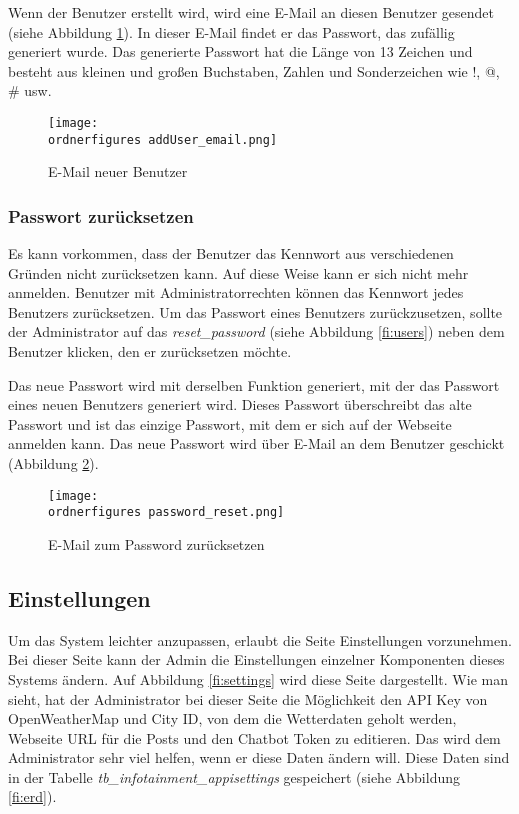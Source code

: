 Wenn der Benutzer erstellt wird, wird eine E-Mail an diesen Benutzer gesendet (siehe Abbildung \ref{fi:addUser_email}). In dieser E-Mail findet er das Passwort, das zufällig generiert wurde. Das generierte Passwort hat die Länge von 13 Zeichen und besteht aus kleinen und großen Buchstaben, Zahlen und Sonderzeichen wie !, @, \# usw.
\begin{figure}[H]
	\centering
	\texttt{[image: \\ordnerfigures addUser\_email.png]}
	\caption{E-Mail neuer Benutzer }
	\label{fi:addUser_email}
\end{figure}


\subsubsection{Passwort zurücksetzen}

Es kann vorkommen, dass der Benutzer das Kennwort aus verschiedenen Gründen nicht zurücksetzen kann. Auf diese Weise kann er sich nicht mehr anmelden. Benutzer mit Administratorrechten können das Kennwort jedes Benutzers zurücksetzen. Um das Passwort eines Benutzers zurückzusetzen, sollte der Administrator auf das \textit{reset\_password} (siehe Abbildung \ref{fi:users}) neben dem Benutzer klicken, den er zurücksetzen möchte.

Das neue Passwort wird mit derselben Funktion generiert, mit der das Passwort eines neuen Benutzers generiert wird. Dieses Passwort überschreibt das alte Passwort und ist das einzige Passwort, mit dem er sich auf der Webseite anmelden kann. Das neue Passwort wird \"uber E-Mail an dem Benutzer geschickt (Abbildung \ref{fi:password_reset}).

\begin{figure}[H]
	\centering
	\texttt{[image: \\ordnerfigures password\_reset.png]}
	\caption{E-Mail zum Password zurücksetzen}
	\label{fi:password_reset}
\end{figure}


\subsection{Einstellungen}
Um das System leichter anzupassen, erlaubt die Seite Einstellungen vorzunehmen. Bei dieser Seite kann der Admin die Einstellungen einzelner Komponenten dieses Systems ändern. Auf Abbildung \ref{fi:settings} wird diese Seite dargestellt. Wie man sieht, hat der Administrator bei dieser Seite die Möglichkeit den API Key von OpenWeatherMap und City ID, von dem die Wetterdaten geholt werden, Webseite URL für die Posts und den Chatbot Token zu editieren. Das wird dem Administrator sehr viel helfen, wenn er diese Daten ändern will. Diese Daten sind in der Tabelle \textit{tb\_infotainment\_appisettings} gespeichert (siehe Abbildung \ref{fi:erd}).

